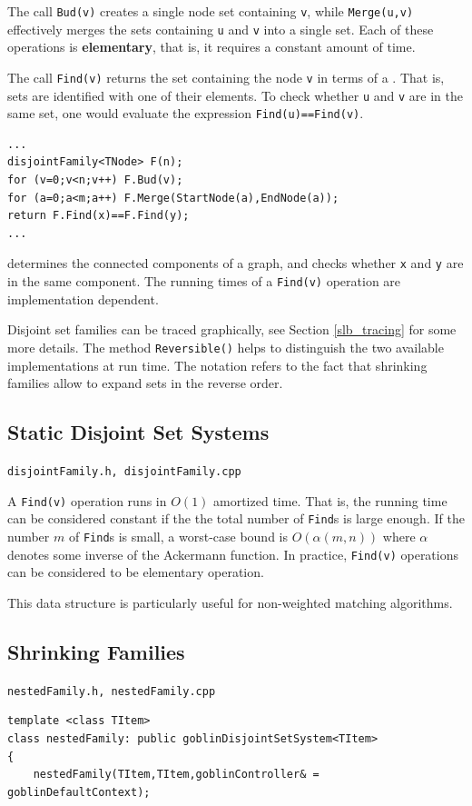 \documentclass[a4paper,11pt,twoside]{book}
\begin{document}
\begin{multicols}{2}
The call \verb/Bud(v)/ creates a single node set containing \verb/v/, while
\verb/Merge(u,v)/ effectively merges the sets containing \verb/u/ and \verb/v/
into a single set. Each of these operations is
{\bf elementary}, that is, it
requires a constant amount of time.

The call \verb/Find(v)/ returns the set containing the node \verb/v/ in terms of a
. That is, sets are identified with one of their elements.
To check whether \verb/u/ and \verb/v/ are in the same set, one would evaluate
the expression \verb/Find(u)==Find(v)/.
\begin{mysample}
\begin{verbatim}
...
disjointFamily<TNode> F(n);
for (v=0;v<n;v++) F.Bud(v);
for (a=0;a<m;a++) F.Merge(StartNode(a),EndNode(a));
return F.Find(x)==F.Find(y);
...
\end{verbatim}
\end{mysample}
determines the connected components of a graph, and checks whether \verb/x/ and
\verb/y/ are in the same component. The running times of a \verb/Find(v)/
operation are implementation dependent.

Disjoint set families can be traced graphically, see Section
\ref{slb_tracing} for some more details. The method \verb/Reversible()/ helps
to distinguish the two available implementations at run time. The notation
refers to the fact that shrinking families allow to expand sets in the reverse
order.


\subsection{Static Disjoint Set Systems}
\label{slb_dsu}
\myincludes\verb/disjointFamily.h, disjointFamily.cpp/

\bigskip\noindent
A \verb/Find(v)/ operation runs in $O(1)$ amortized time. That is, the running
time can be considered constant if the the total number of \verb/Find/s is
large enough. If the number $m$ of \verb/Find/s is small, a worst-case bound is
$O(\alpha(m,n))$ where $\alpha$ denotes some inverse of the Ackermann
function. In practice, \verb/Find(v)/ operations can be considered to be
elementary operation.

This data structure is particularly useful for non-weighted matching algorithms.


\subsection{Shrinking Families}
\label{slb_shrfam}
\myincludes\verb/nestedFamily.h, nestedFamily.cpp/
\begin{mymethods}
\begin{verbatim}
template <class TItem>
class nestedFamily: public goblinDisjointSetSystem<TItem>
{
    nestedFamily(TItem,TItem,goblinController& = goblinDefaultContext);


\end{verbatim}
\end{mymethods}
\end{multicols}
\end{document}
